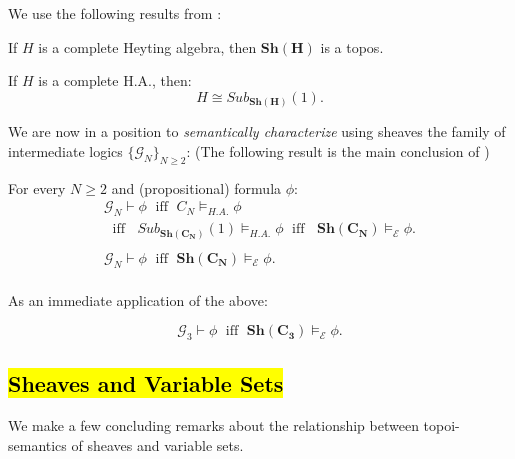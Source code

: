  We use the following results from \cite{borceaux}:
 
 \begin{prop}
 	If $H$ is a complete Heyting algebra, then $\mathbf{Sh}(\mathbf{H})$ is a topos.
 \end{prop}

  \begin{prop}
  	If $H$ is a complete H.A., then:
  	\begin{equation*}
  		 H \cong Sub_{ \mathbf{Sh}(\mathbf{H})} (1). 
  	\end{equation*}
  \end{prop}
  \newpage
  
  We are now in a position to \emph{semantically characterize} using sheaves the family of intermediate logics $\{\mathcal{G}_N\}_{N \geq 2}$:\newline
  (The following result is the main conclusion of \cite{lisboa})
  \begin{thm}

  	For every $N\geq 2$ and (propositional) formula $\phi$:
  	\begin{gather*}
  		\mathcal{G}_N \vdash \phi \;\text{ iff }\; C_N \models_{H.A.} \phi
  		\\  \;\text{ iff }\; \; Sub_{ \mathbf{Sh}(\mathbf{C_N})} (1) \models_{H.A.} \phi \;\text{ iff }\; 
  		\; \mathbf{Sh}(\mathbf{C_N}) \models_{\mathcal{E}} \phi. \\
  		\\
  		\mathcal{G}_N \vdash \phi \;\text{ iff }\;  \mathbf{Sh}(\mathbf{C_N}) \models_{\mathcal{E}} \phi. \\
  	\end{gather*}
  \end{thm}
  
  As an immediate application of the above:
  \begin{cor}
  	  \begin{equation*}
  		\mathcal{G}_{3} \vdash \phi \;\text{ iff }\;\mathbf{Sh}(\mathbf{C_{3}}) \models_{\mathcal{E}} \phi.
  	\end{equation*}
  \end{cor}
  
  \newpage
  \subsection{\hl{Sheaves and Variable Sets}}
  We make a few concluding remarks about the relationship between topoi-semantics of sheaves and variable sets. \newline
  
